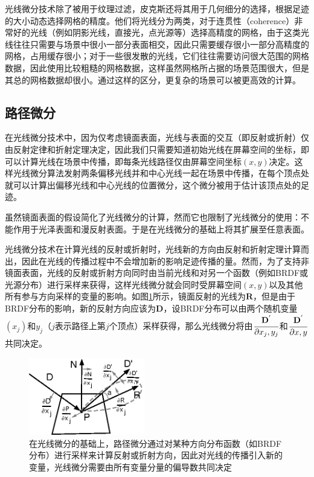 光线微分技术除了被用于纹理过滤，皮克斯\cite{a:RayDifferentialsandMultiresolutionGeometryCachingforDistributionRayTracinginComplexScenes,a:RayTracingfortheMovieCars}还将其用于几何细分的选择，根据足迹的大小动态选择网格的精度。他们将光线分为两类，对于连贯性（coherence）非常好的光线（例如阴影光线，直接光，点光源等）选择高精度的网格，由于这类光线往往只需要与场景中很小一部分表面相交，因此只需要缓存很小一部分高精度的网格，占用缓存很小；对于一些很发散的光线，它们往往需要访问很大范围的网格数据，因此使用比较粗糙的网格数据，这样虽然网格所占据的场景范围很大，但是其总的网格数据却很小。通过这样的区分，更复杂的场景可以被更高效的计算。








\subsection{路径微分}\label{sec:pt-path-differentials}
在光线微分技术中，因为仅考虑镜面表面，光线与表面的交互（即反射或折射）仅由反射定律和折射定理决定，因此我们只需要知道初始光线在屏幕空间的坐标，即可以计算光线在场景中传播，即每条光线路径仅由屏幕空间坐标$(x,y)$决定。这样光线微分算法发射两条偏移光线并和中心光线一起在场景中传播，在每个顶点处就可以计算出偏移光线和中心光线的位置微分，这个微分被用于估计该顶点处的足迹。

虽然镜面表面的假设简化了光线微分的计算，然而它也限制了光线微分的使用：不能作用于光泽表面和漫反射表面。于是\cite{a:Pathdifferentialsandapplications}在光线微分的基础上将其扩展至任意表面。

光线微分技术在计算光线的反射或折射时，光线新的方向由反射和折射定理计算而出，因此在光线的传播过程中不会增加新的影响足迹传播的量。然而，为了支持非镜面表面，光线的反射或折射方向同时由当前光线和对另一个函数（例如BRDF或光源分布）进行采样来获得，这样光线微分就会同时受屏幕空间$(x,y)$以及其他所有参与方向采样的变量的影响。如图\ref{f:pt-path-differentials}所示，镜面反射的光线为$\mathbf{R}$，但是由于BRDF分布的影响，新的反射方向应该为$\mathbf{D}$，设BRDF分布可以由两个随机变量$(x_j)$和$y_j$（$j$表示路径上第$j$个顶点）采样获得，那么光线微分将由$ \cfrac{\mathbf{D}^{'}}{{\rm \partial} x_j,y_j}$和$ \cfrac{\mathbf{D}^{'}}{{\rm \partial} x,y}$共同决定。

\begin{figure}
	\sidecaption
	\includegraphics[width=0.45\textwidth]{figures/pt/path-differentials}
	\caption{在光线微分的基础上，路径微分通过对某种方向分布函数（如BRDF分布）进行采样来计算反射或折射方向，因此对光线的传播引入新的变量，光线微分需要由所有变量分量的偏导数共同决定}
	\label{f:pt-path-differentials}
\end{figure}


